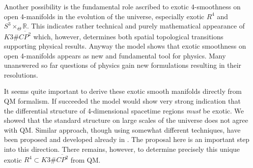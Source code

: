 \documentclass[12pt]{article}
\begin{document}
Another possibility is the fundamental role ascribed to exotic 4-smoothness on open 4-manifolds in the evolution of the universe, especially exotic $R^4$ and $S^3\times_{\Theta} \mathbb{R}$. This indicates rather technical and purely mathematical appearance of $K3\# \overline{CP^2}$ which, however, determines both spatial topological transitions supporting physical results. Anyway the model shows that exotic smoothness on open 4-manifolds appears as new and fundamental tool for physics. Many unanswered so far questions of physics gain new formulations resulting in their resolutions. 

It seems quite important to derive these exotic smooth manifolds directly from QM formalism. If succeeded the model would show very strong indication that the differential structure of 4-dimensional spacetime regions \emph{must} be exotic. We showed that the standard structure on large scales of the universe does not agree with QM. Similar approach, though using somewhat different techniques, have been proposed and developed already in \cite{JKuniverse17,JK2017a}. 
The proposal here is an important step into this direction. There remains, however, to determine precisely this unique exotic $R^4\subset K3\# \overline{CP^2}$ from QM. 
\end{document}
